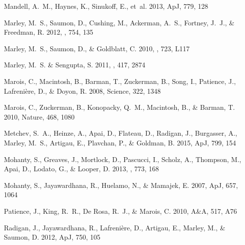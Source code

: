 \documentclass[apj]{emulateapj}
\begin{document}
\begin{thebibliography}{52}
Mandell, A.~M., Haynes, K., Sinukoff, E., {et~al.} 2013, ApJ, 779, 128

{Marley}, M.~S., {Saumon}, D., {Cushing}, M., {Ackerman}, A.~S., {Fortney},
  J.~J., \& {Freedman}, R. 2012, \apj, 754, 135

{Marley}, M.~S., {Saumon}, D., \& {Goldblatt}, C. 2010, \apjl, 723, L117

{Marley}, M.~S. \& {Sengupta}, S. 2011, \mnras, 417, 2874

Marois, C., Macintosh, B., Barman, T., Zuckerman, B., Song, I., Patience, J.,
  Lafreni\`{e}re, D., \& Doyon, R. 2008, Science, 322, 1348

Marois, C., Zuckerman, B., Konopacky, Q.~M., Macintosh, B., \& Barman, T. 2010,
  Nature, 468, 1080

Metchev, S.~A., Heinze, A., Apai, D., Flateau, D., Radigan, J., Burgasser, A.,
  Marley, M.~S., Artigau, E., Plavchan, P., \& Goldman, B. 2015, ApJ, 799, 154

{Mohanty}, S., {Greaves}, J., {Mortlock}, D., {Pascucci}, I., {Scholz}, A.,
  {Thompson}, M., {Apai}, D., {Lodato}, G., \& {Looper}, D. 2013, \apj, 773,
  168

Mohanty, S., Jayawardhana, R., Huelamo, N., \& Mamajek, E. 2007, ApJ, 657, 1064

Patience, J., King, R.~R., {De Rosa}, R.~J., \& Marois, C. 2010, A\&A, 517, A76

Radigan, J., Jayawardhana, R., Lafreni\`{e}re, D., Artigau, E., Marley, M., \&
  Saumon, D. 2012, ApJ, 750, 105


\end{thebibliography}
\end{document}
